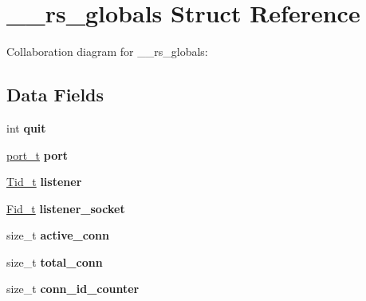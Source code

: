 \hypertarget{struct____rs__globals}{}\section{\+\_\+\+\_\+rs\+\_\+globals Struct Reference}
\label{struct____rs__globals}


Collaboration diagram for \+\_\+\+\_\+rs\+\_\+globals\+:
\subsection*{Data Fields}
\begin{DoxyCompactItemize}
\item 
int {\bfseries quit}\hypertarget{struct____rs__globals_a883fedeeb83e8f30d55072af301365a4}{}\label{struct____rs__globals_a883fedeeb83e8f30d55072af301365a4}

\item 
\hyperlink{group__syscalls_ga13894e5a2ffd5febb7aeb90e87239d61}{port\+\_\+t} {\bfseries port}\hypertarget{struct____rs__globals_a6dc49afd76e2743a62e0a467ab5af41b}{}\label{struct____rs__globals_a6dc49afd76e2743a62e0a467ab5af41b}

\item 
\hyperlink{group__syscalls_gaf67ad1c55e6b2a79bf8a99106380ce01}{Tid\+\_\+t} {\bfseries listener}\hypertarget{struct____rs__globals_afc8fa99b7b3fcee63f780cc0e3690ebf}{}\label{struct____rs__globals_afc8fa99b7b3fcee63f780cc0e3690ebf}

\item 
\hyperlink{group__syscalls_ga5097222c5f0da97d92d4712359abc38f}{Fid\+\_\+t} {\bfseries listener\+\_\+socket}\hypertarget{struct____rs__globals_a7f274f9a80478d9b33b743e1432f2438}{}\label{struct____rs__globals_a7f274f9a80478d9b33b743e1432f2438}

\item 
size\+\_\+t {\bfseries active\+\_\+conn}\hypertarget{struct____rs__globals_ad1be788d826e6e30ab8df0f12d6a53a3}{}\label{struct____rs__globals_ad1be788d826e6e30ab8df0f12d6a53a3}

\item 
size\+\_\+t {\bfseries total\+\_\+conn}\hypertarget{struct____rs__globals_ad4f03cddafaa93561024a6ab26c937d3}{}\label{struct____rs__globals_ad4f03cddafaa93561024a6ab26c937d3}

\item 
size\+\_\+t {\bfseries conn\+\_\+id\+\_\+counter}\hypertarget{struct____rs__globals_a914de4c47a4da5f5df4fa5c4a1de899b}{}\label{struct____rs__globals_a914de4c47a4da5f5df4fa5c4a1de899b}


\end{DoxyCompactItemize}

